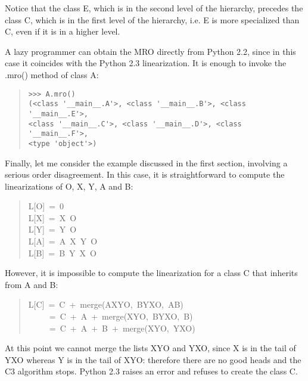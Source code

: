 \documentclass[10pt,english]{article}
\begin{document}
Notice that the class E, which is in the second level of the hierarchy,
precedes the class C, which is in the first level of the hierarchy, i.e.
E is more specialized than C, even if it is in a higher level.

A lazy programmer can obtain the MRO directly from Python 2.2, since in
this case it coincides with the Python 2.3 linearization.  It is enough
to invoke the .mro() method of class A:
\begin{quote}
\begin{verbatim}>>> A.mro()
(<class '__main__.A'>, <class '__main__.B'>, <class '__main__.E'>,
<class '__main__.C'>, <class '__main__.D'>, <class '__main__.F'>,
<type 'object'>)\end{verbatim}
\end{quote}

Finally, let me consider the example discussed in the first section,
involving a serious order disagreement.  In this case, it is
straightforward to compute the linearizations of O, X, Y, A and B:
\begin{quote}
\begin{ttfamily}\begin{flushleft}
\mbox{L[O]~=~0}\\
\mbox{L[X]~=~X~O}\\
\mbox{L[Y]~=~Y~O}\\
\mbox{L[A]~=~A~X~Y~O}\\
\mbox{L[B]~=~B~Y~X~O}
\end{flushleft}\end{ttfamily}
\end{quote}

However, it is impossible to compute the linearization for a class C
that inherits from A and B:
\begin{quote}
\begin{ttfamily}\begin{flushleft}
\mbox{L[C]~=~C~+~merge(AXYO,~BYXO,~AB)}\\
\mbox{~~~~~=~C~+~A~+~merge(XYO,~BYXO,~B)}\\
\mbox{~~~~~=~C~+~A~+~B~+~merge(XYO,~YXO)}
\end{flushleft}\end{ttfamily}
\end{quote}

At this point we cannot merge the lists XYO and YXO, since X is in the
tail of YXO whereas Y is in the tail of XYO:  therefore there are no
good heads and the C3 algorithm stops.  Python 2.3 raises an error and
refuses to create the class C.
\end{document}
